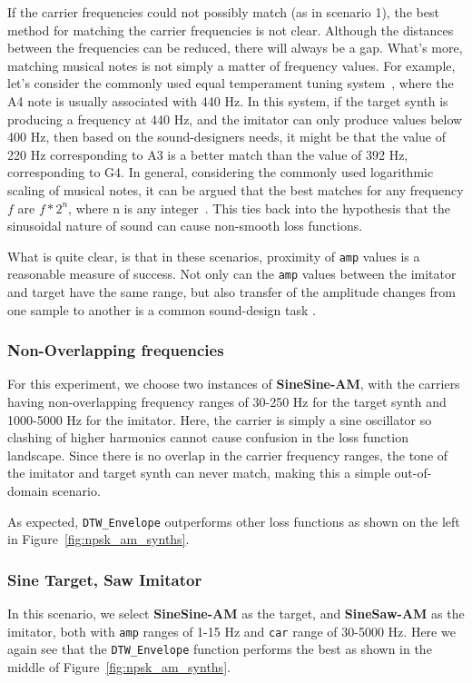 \documentclass{article} %
\newcommand{\highlight}[1]{\textcolor[RGB]{00,150,00}{#1}}
\newcommand{\DTWEnv}{\texttt{DTW\_Envelope}\xspace}
\newcommand{\FMMod}{\textbf{SineSaw-AM}\xspace}
\newcommand{\FMModvtwo}{\textbf{SineSine-AM}\xspace}
\begin{document}
If the carrier frequencies could not possibly match (as in scenario 1), the best method for matching the carrier frequencies is not clear. Although the distances between the frequencies can be reduced, there will always be a gap. What's more, matching musical notes is not simply a matter of frequency values. For example, let's consider the commonly used equal temperament tuning system~\cite{sethares2005tuning}, where the A4 note is usually associated with 440 Hz. In this system, if the target synth is producing a frequency at 440 Hz, and the imitator can only produce values below 400 Hz, then based on the sound-designers needs, it might be that the value of 220 Hz corresponding to A3 is a better match than the value of 392 Hz, corresponding to G4. In general, considering the commonly used logarithmic scaling of musical notes, it can be argued that the best matches for any frequency $f$ are $f*2^{n}$, where n is any integer~\cite{young1939terminology}. \highlight{This ties back into the hypothesis that the sinusoidal nature of sound can cause non-smooth loss functions.}

What is quite clear, is that in these scenarios, proximity of \texttt{amp} values is a reasonable measure of success. Not only can the \texttt{amp} values between the imitator and target have the same range, but also transfer of the amplitude changes from one sample to another is a common sound-design task \cite{engel2020ddsp}.  

\subsubsection{Non-Overlapping frequencies}
\label{sec:am_sound_matching_nonoverlapping}
For this experiment, we choose two instances of \FMModvtwo, with the carriers having non-overlapping frequency ranges of 30-250 Hz for the target synth and 1000-5000 Hz for the imitator. Here, the carrier is simply a sine oscillator so clashing of higher harmonics cannot cause confusion in the loss function landscape. Since there is no overlap in the carrier frequency ranges, the tone of the imitator and target synth can never match, making this a simple out-of-domain scenario. 

As expected, \DTWEnv outperforms other loss functions as shown on the left in Figure~\ref{fig:npsk_am_synths}. 

\subsubsection{Sine Target, Saw Imitator}
\label{sec:am_sinetarget_sawimitate}
In this scenario, we select \FMModvtwo as the target, and \FMMod as the imitator, both with \texttt{amp} ranges of 1-15 Hz and \texttt{car} range of 30-5000 Hz. Here we again see that the \DTWEnv function performs the best as shown in the middle of Figure~\ref{fig:npsk_am_synths}.
\end{document}
